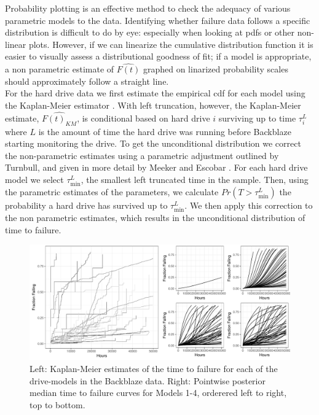\documentclass[12pt]{article}
\begin{document}
Probability plotting is an effective method to check the adequacy of various parametric models to the data.  Identifying whether failure data follows a specific distribution is difficult to do by eye: especially when looking at pdfs or other non-linear plots.  However, if we can linearize the cumulative distribution function it is easier to visually assess a distributional goodness of fit; if a model is appropriate, a non parametric estimate of $\hat{F(t)}$ graphed on linarized probability scales should approximately follow a straight line. \\

For the hard drive data we first estimate the empirical cdf for each model using the Kaplan-Meier estimator \cite{kaplan}.  With left truncation, however, the Kaplan-Meier estimate, $\widehat{F(t)_{KM}}$, is conditional based on hard drive $i$ surviving up to time $\tau_i^L$ where $L$ is the amount of time the hard drive was running before Backblaze starting monitoring the drive.  To get the unconditional distribution we correct the non-parametric estimates using a parametric adjustment outlined by Turnbull, and given in more detail by Meeker and Escobar \cite{turnbull,meeker}.  For each hard drive model we select $\tau_{\text{min}}^L$, the smallest left truncated time in the sample.  Then, using the parametric estimates of the parameters, we calculate $Pr(T>\tau_\text{min}^L)$ the probability a hard drive has survived up to $\tau_{\text{min}}^L$.  We then apply this correction to the non parametric estimates, which results in the unconditional distribution of time to failure.\\

\begin{figure}
\includegraphics[width=\textwidth]{fig/heterogeneity_compare_preliminary.pdf}
\caption{Left: Kaplan-Meier estimates of the time to failure for each of the drive-models in the Backblaze data. Right: Pointwise posterior median time to failure curves for Models 1-4, orderered left to right, top to bottom.}
\label{fig2}
\end{figure}
\end{document}
